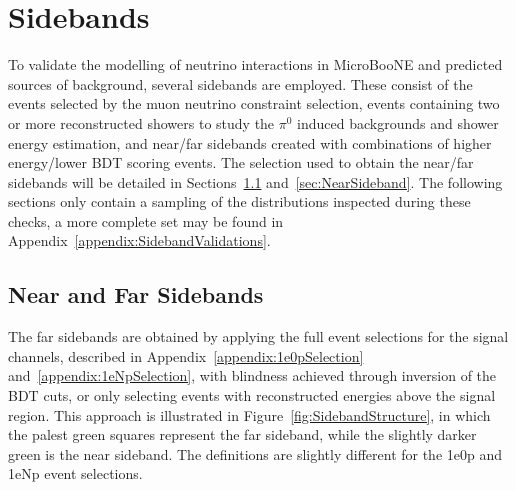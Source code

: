 \newpage
\section{Sidebands}
\label{sec:sidebands}


To validate the modelling of neutrino interactions in MicroBooNE and predicted sources of background, several sidebands are employed. These consist of the events selected by the muon neutrino constraint selection, events containing two or more reconstructed showers to study the $\pi^0$ induced backgrounds and shower energy estimation, and near/far sidebands created with combinations of higher energy/lower BDT scoring events. The selection used to obtain the near/far sidebands will be detailed in Sections~\ref{sec:FarSideband} and~\ref{sec:NearSideband}. The following sections only contain a sampling of the distributions inspected during these checks, a more complete set may be found in Appendix~\ref{appendix:SidebandValidations}.




\subsection{Near and Far Sidebands}
\label{sec:FarSideband}

The far sidebands are obtained by applying the full event selections for the signal channels, described in Appendix~\ref{appendix:1e0pSelection} and~\ref{appendix:1eNpSelection}, with blindness achieved through inversion of the BDT cuts, or only selecting events with reconstructed energies above the signal region. This approach is illustrated in Figure~\ref{fig:SidebandStructure}, in which the palest green squares represent the far sideband, while the slightly darker green is the near sideband. The definitions are slightly different for the 1e0p and 1eNp event selections.

